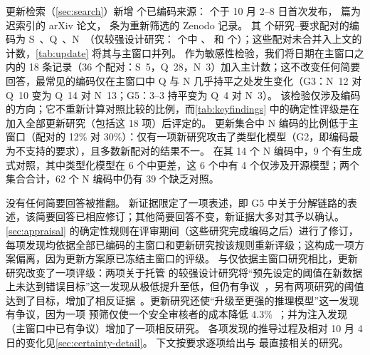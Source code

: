 更新检索（\cref{sec:search}）新增 \nUCoded{} 个已编码来源：\nUSetPostWindow{} 个于 10 月 2--8 日首次发布，\nUSetLateIndexed{} 篇为迟索引的 arXiv 论文，\nUSetReScreened{} 条为重新筛选的 Zenodo 记录。
其 \nURows{} 个研究--要求配对的编码为 S~\nUS{}、Q~\nUQ{}、N~\nUN{}（仅较强设计研究：\nUStrongRows{} 个中 \nUStrongS{}、\nUStrongQ{} 和 \nUStrongN{} 个）；这些配对未合并入上文的计数，\cref{tab:update} 将其与主窗口并列。
作为敏感性检验，我们将日期在主窗口之内的 18 条记录（36 个配对：S~5，Q~28，N~3）加入主计数；这不改变任何简要回答，最常见的编码仅在主窗口中 Q 与 N 几乎持平之处发生变化（G3：N~12 对 Q~10 变为 Q~14 对 N~13；G5：3--3 持平变为 Q~4 对 N~3）。
该检验仅涉及编码的方向；它不重新计算对照比较的比例，而\cref{tab:keyfindings} 中的确定性评级是在加入全部更新研究（包括这 18 项）后评定的。
更新集合中 N 编码的比例低于主窗口（配对的 12\% 对 30\%）：仅有一项新研究攻击了类型化模型（G2，即编码最为不支持的要求），且多数新配对的结果不一。
在其 14 个 N 编码中，9 个有生成式对照，其中类型化模型在 6 个中更差，这 6 个中有 4 个仅涉及开源模型；两个集合合计，62 个 N 编码中仍有 39 个缺乏对照。

没有任何简要回答被推翻。
新证据限定了一项表述，即 G5 中关于分解链路的表述，该简要回答已相应修订；其他简要回答不变，新证据大多对其予以确认。
\cref{sec:appraisal} 的确定性规则在评审期间（这些研究完成编码之后）进行了修订，每项发现均依据全部已编码的主窗口和更新研究按该规则重新评级；这构成一项方案偏离，因为更新方案原已冻结主窗口的评级。
与仅依据主窗口研究相比，更新研究改变了一项评级：两项关于托管 \jev{} 的较强设计研究将“预先设定的阈值在新数据上未达到错误目标”这一发现从极低提升至低，但仍有争议~\cite{arx03387,arx02267}，另有两项研究的阈值达到了目标，增加了相反证据~\cite{zen22935043,zen23075657}\zmark{}。更新研究还使“升级至更强的推理模型”这一发现有争议，因为一项 \jev{} 预筛仅使一个安全审核者的成本降低 4.3\%~\cite{arx02267}；并为注入发现（主窗口中已有争议）增加了一项相反研究。
各项发现的推导过程及相对 10 月 4 日的变化见\cref{sec:certainty-detail}。
下文按要求逐项给出与 \pol{} 最直接相关的研究。

